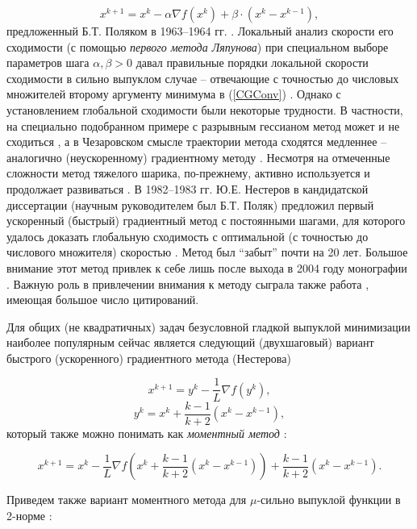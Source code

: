   \begin{equation}
  \label{HB}
  x^{k+1}=x^k-\alpha \nabla f\left( {x^k} \right)+\beta \cdot \left( 
  {x^k-x^{k-1}} \right),
  \end{equation}
  предложенный Б.Т. Поляком в 1963--1964 гг. \cite{Polyak1964}. Локальный анализ скорости его сходимости (с помощью \textit{первого метода Ляпунова}) при специальном выборе параметров шага $\alpha ,\beta >0$ давал правильные порядки локальной скорости сходимости в сильно выпуклом случае --  отвечающие с точностью до числовых множителей второму аргументу минимума в (\ref{CGConv}) \cite{Polyak1983}. Однако с установлением глобальной сходимости были некоторые трудности. В частности, на специально подобранном примере с разрывным гессианом метод может и не сходиться \cite{lessard2016analysis}, а в Чезаровском смысле траектории метода сходятся медленнее -- аналогично (неускоренному) градиентному методу \cite{ghadimi2015global}. Несмотря на отмеченные сложности метод тяжелого шарика, по-прежнему, активно используется и продолжает развиваться \cite{loizou2017linearly}. В 1982--1983 гг. Ю.Е. Нестеров в кандидатской диссертации (научным руководителем был Б.Т. Поляк) предложил первый ускоренный (быстрый) градиентный метод с постоянными шагами, для которого удалось доказать глобальную сходимость с оптимальной (с точностью до числового множителя) скоростью \cite{Nesterov1983}. Метод был ``забыт'' почти на 20 лет. Большое внимание этот метод привлек к себе лишь после выхода в 2004 году монографии \cite{nesterov2013introductory}. Важную роль в привлечении внимания к методу сыграла также работа \cite{beck2009fast}, имеющая большое число цитирований.
  \fi

  Для общих (не квадратичных) задач безусловной гладкой выпуклой минимизации наиболее популярным сейчас является следующий (двухшаговый) вариант быстрого (ускоренного) градиентного метода (Нестерова) 

  \[
  x^{k+1}=y^k-\frac{1}{L}\nabla f\left( {y^k} \right),
  \]
  \[
  y^k=x^k+\frac{k-1}{k+2}\left( {x^k-x^{k-1}} \right),
  \]
  который также можно понимать как \textit{моментный метод} \cite{su2014differential}:

  \begin{equation}
  \label{moment}
  x^{k+1}=x^k-\frac{1}{L}\nabla f\left( {x^k+\frac{k-1}{k+2}\left( 
  {x^k-x^{k-1}} \right)} \right)+\frac{k-1}{k+2}\left( {x^k-x^{k-1}} \right).
  \end{equation}

  Приведем также вариант моментного метода для $\mu $-сильно выпуклой функции в 2-норме \cite{nesterov2013introductory}:

